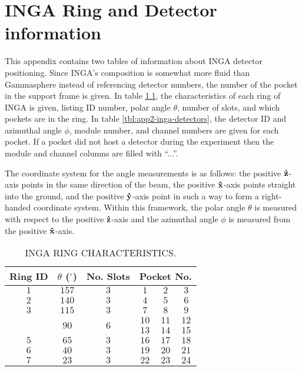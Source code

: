%
%

\chapter{INGA Ring and Detector information}
\label{app:inga-rings-and-detectors}
This appendix contains two tables of information about INGA detector positioning. Since INGA's composition is somewhat more fluid than Gammasphere instead of referencing detector numbers, the number of the pocket in the support frame is given. In table \ref{tbl:app2-inga-rings}, the characteristics of each ring of INGA is given, listing ID number, polar angle $\theta$, number of slots, and which pockets are in the ring.  In table \ref{tbl:app2-inga-detectors}, the detector ID and azimuthal angle $\phi$, module number, and channel numbers are given for each pocket. If a pocket did not host a detector during the experiment then the module and channel columns are filled with ``...''.

The coordinate system for the angle measurements is as follows: the positive $\boldsymbol{\hat{\textbf{z}}}$-axis points in the same direction of the beam, the positive $\boldsymbol{\hat{\textbf{x}}}$-axis points straight into the ground, and the positive $\boldsymbol{\hat{\textbf{y}}}$-axis point in such a way to form a right-handed coordinate system. Within this framework, the polar angle $\theta$ is measured with respect to the positive $\boldsymbol{\hat{\textbf{z}}}$-axis and the azimuthal angle $\phi$ is measured from the positive $\boldsymbol{\hat{\textbf{x}}}$-axis.

\begin{table}
\caption{INGA RING CHARACTERISTICS.\label{tbl:app2-inga-rings}}
\begin{center}
\begin{tabular}{|c|c|c|c|c|c|}
\hline
\hline
Ring ID & $\theta$ ($^{\circ}$) & No. Slots&\multicolumn{3}{|c|}{Pocket No.}\\ 
\hline{}$1$&$157$&$3$&$1$&$2$&$3$\\
\hline{}$2$&$140$&$3$&$4$&$5$&$6$\\
\hline{}$3$&$115$&$3$&$7$&$8$&$9$\\
\hline{}\multirow{2}{*}{$4$}&\multirow{2}{*}{$90$}&\multirow{2}{*}{$6$}&$10$&$11$&$12$\\
&&&$13$&$14$&$15$\\
\hline{}$5$&$65$&$3$&$16$&$17$&$18$\\
\hline{}$6$&$40$&$3$&$19$&$20$&$21$\\
\hline{}$7$&$23$&$3$&$22$&$23$&$24$\\
\hline
\hline
\end{tabular}
\end{center}
\end{table}

